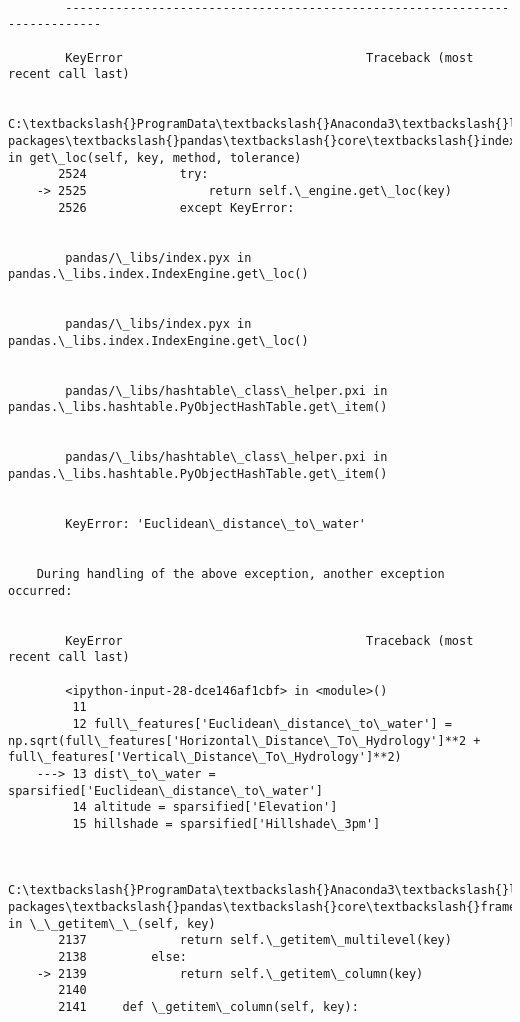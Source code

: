 \documentclass[11pt]{article}
\begin{document}
    \begin{Verbatim}[commandchars=\\\{\}]

        ---------------------------------------------------------------------------

        KeyError                                  Traceback (most recent call last)

        C:\textbackslash{}ProgramData\textbackslash{}Anaconda3\textbackslash{}lib\textbackslash{}site-packages\textbackslash{}pandas\textbackslash{}core\textbackslash{}indexes\textbackslash{}base.py in get\_loc(self, key, method, tolerance)
       2524             try:
    -> 2525                 return self.\_engine.get\_loc(key)
       2526             except KeyError:
    

        pandas/\_libs/index.pyx in pandas.\_libs.index.IndexEngine.get\_loc()
    

        pandas/\_libs/index.pyx in pandas.\_libs.index.IndexEngine.get\_loc()
    

        pandas/\_libs/hashtable\_class\_helper.pxi in pandas.\_libs.hashtable.PyObjectHashTable.get\_item()
    

        pandas/\_libs/hashtable\_class\_helper.pxi in pandas.\_libs.hashtable.PyObjectHashTable.get\_item()
    

        KeyError: 'Euclidean\_distance\_to\_water'

        
    During handling of the above exception, another exception occurred:
    

        KeyError                                  Traceback (most recent call last)

        <ipython-input-28-dce146af1cbf> in <module>()
         11 
         12 full\_features['Euclidean\_distance\_to\_water'] = np.sqrt(full\_features['Horizontal\_Distance\_To\_Hydrology']**2 + full\_features['Vertical\_Distance\_To\_Hydrology']**2)
    ---> 13 dist\_to\_water = sparsified['Euclidean\_distance\_to\_water']
         14 altitude = sparsified['Elevation']
         15 hillshade = sparsified['Hillshade\_3pm']
    

        C:\textbackslash{}ProgramData\textbackslash{}Anaconda3\textbackslash{}lib\textbackslash{}site-packages\textbackslash{}pandas\textbackslash{}core\textbackslash{}frame.py in \_\_getitem\_\_(self, key)
       2137             return self.\_getitem\_multilevel(key)
       2138         else:
    -> 2139             return self.\_getitem\_column(key)
       2140 
       2141     def \_getitem\_column(self, key):
    


\end{Verbatim}
\end{document}
